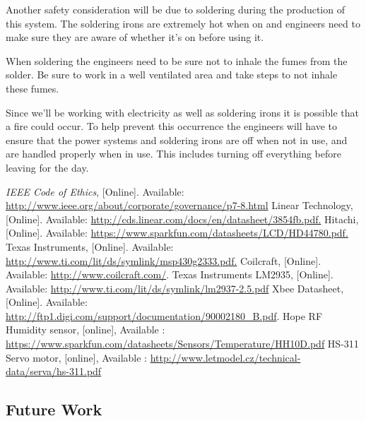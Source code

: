 Another safety consideration will be due to soldering during the production of this system. The soldering irons are extremely hot when on and engineers need to make sure they are aware of whether it's on before using it.

When soldering the engineers need to be sure not to inhale the fumes from the solder. Be sure to work in a well ventilated area and take steps to not inhale these fumes.

Since we'll be working with electricity as well as soldering irons it is possible that a fire could occur. To help prevent this occurrence the engineers will have to ensure that the power systems and soldering irons are off when not in use, and are handled properly when in use. This includes turning off everything before leaving for the day.

\pagebreak
\begin{thebibliography}{10}
\textit{IEEE Code of Ethics}, [Online]. Available: \url{http://www.ieee.org/about/corporate/governance/p7-8.html}
Linear Technology, [Online]. Available: \url{http://cds.linear.com/docs/en/datasheet/3854fb.pdf.}
Hitachi, [Online]. Available: \url{https://www.sparkfun.com/datasheets/LCD/HD44780.pdf.}
Texas Instruments, [Online]. Available: \url{http://www.ti.com/lit/ds/symlink/msp430g2333.pdf.}
Coilcraft, [Online]. Available: \url{http://www.coilcraft.com/}.
Texas Instruments
LM2935, [Online]. Available: \url{http://www.ti.com/lit/ds/symlink/lm2937-2.5.pdf}
Xbee Datasheet,
[Online]. Available: \url{http://ftp1.digi.com/support/documentation/90002180\_B.pdf}.
Hope RF Humidity sensor, [online], Available : \url{https://www.sparkfun.com/datasheets/Sensors/Temperature/HH10D.pdf}
HS-311 Servo motor, [online], Available : \url{http://www.letmodel.cz/technical-data/serva/hs-311.pdf}
\end{thebibliography}
\subsection{Future Work}